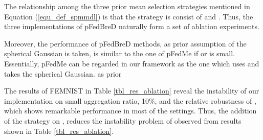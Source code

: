 \documentclass{article}
\begin{document}
\begin{table}[t]
    \centering
    \caption{Average testing accuracy (\%) in Ablation.}
    \label{tbl_res_ablation}
\end{table}

The relationship among the three prior mean selection strategies mentioned in Equation (\ref{equ_def_spmmdl}) is that the strategy  is consist of  and . Thus, the three implementations of pFedBreD naturally form a set of ablation experiments. 

Moreover, the performance of pFedBreD methods, as prior assumption of the spherical Gaussian is taken, is similar to the one of pFedMe if  or  is small. Essentially, pFedMe can be regarded in our framework as the one which uses  and takes the spherical Gaussian. as prior

The results of FEMNIST in Table \ref{tbl_res_ablation} reveal the instability of our implementation  on small aggregation ratio, 10\%, and the relative robustness of , which shows remarkable performance in most of the settings. Thus, the addition of the strategy  on , reduces the instability problem of  observed from results shown in Table \ref{tbl_res_ablation}.
\end{document}
